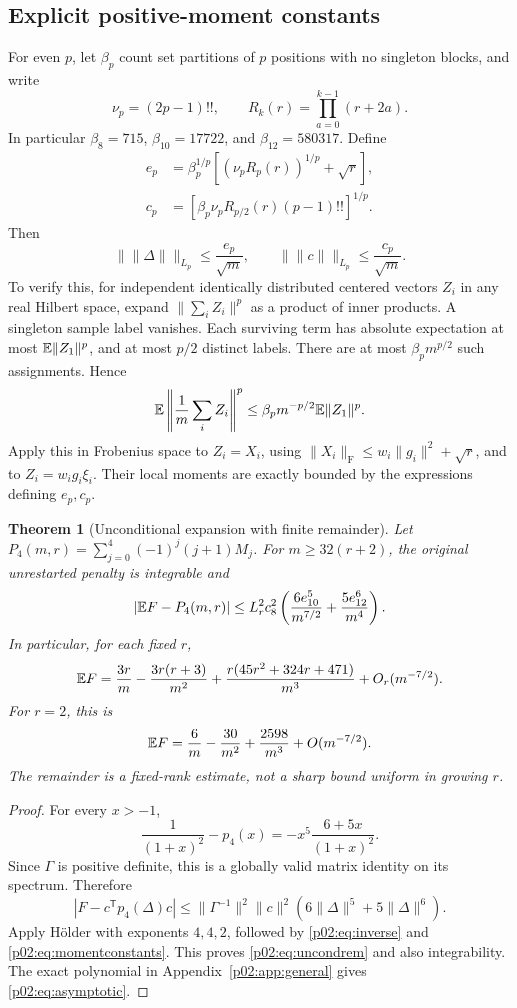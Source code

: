 \documentclass[11pt]{article}
\numberwithin{equation}{section}
\newtheorem{theorem}{Theorem}[section]
\theoremstyle{definition}\newtheorem{definition}[theorem]{Definition}
\theoremstyle{remark}\newtheorem{remark}[theorem]{Remark}
\newcommand{\norm}[1]{\lVert#1\rVert}\newcommand{\ip}[2]{\langle#1,#2\rangle}
\newcommand{\Frob}[1]{\norm{#1}_{\mathrm F}}
\begin{document}
\subsection{Explicit positive-moment constants}
For even \(p\), let \(\beta_p\) count set partitions of \(p\) positions with no singleton blocks, and write
\[
 \nu_p=(2p-1)!!,\qquad R_k(r)=\prod_{a=0}^{k-1}(r+2a).
\]
In particular \(\beta_8=715\), \(\beta_{10}=17722\), and \(\beta_{12}=580317\).
Define
\begin{align*}
 e_p&=\beta_p^{1/p}\left[(\nu_pR_p(r))^{1/p}+\sqrt r\right],\\
 c_p&=\left[\beta_p\nu_pR_{p/2}(r)(p-1)!!\right]^{1/p}.
\end{align*}
Then
\begin{equation}\label{p02:eq:momentconstants}
 \bigl\|\norm \Delta\bigr\|_{L_p}\le\frac{e_p}{\sqrt m},\qquad
 \bigl\|\norm c\bigr\|_{L_p}\le\frac{c_p}{\sqrt m}.
\end{equation}
To verify this, for independent identically distributed centered vectors \(Z_i\) in any real Hilbert space, expand \(\norm{\sum_i Z_i}^{p}\) as a product of inner products. A singleton sample label vanishes. Each surviving term has absolute expectation at most \(\E\norm{Z_1}^p\), and at most \(p/2\) distinct labels. There are at most \(\beta_pm^{p/2}\) such assignments. Hence
\[
 \E\left\|\frac1m\sum_i Z_i\right\|^p
 \le\beta_pm^{-p/2}\E\norm{Z_1}^p.
\]
Apply this in Frobenius space to \(Z_i=X_i\), using
\(\Frob{X_i}\le w_i\norm{g_i}^2+\sqrt r\), and to \(Z_i=w_ig_i\xi_i\). Their local moments are exactly bounded by the expressions defining \(e_p,c_p\).

\begin{theorem}[Unconditional expansion with finite remainder]\label{p02:thm:unconditional}
Let
\(P_4(m,r)=\sum_{j=0}^4(-1)^j(j+1)M_j\).
For \(m\ge32(r+2)\), the original unrestarted penalty is integrable and
\begin{equation}\label{p02:eq:uncondrem}
 \left|\mathbb E F-P_4(m,r)\right|
 \le L_r^2c_8^2\left(\frac{6e_{10}^5}{m^{7/2}}+\frac{5e_{12}^6}{m^4}\right).
\end{equation}
In particular, for each fixed \(r\),
\begin{equation}\label{p02:eq:asymptotic}
 \mathbb E F=\frac{3r}{m}-\frac{3r(r+3)}{m^2}
 +\frac{r(45r^2+324r+471)}{m^3}+O_r(m^{-7/2}).
\end{equation}
For \(r=2\), this is
\[
 \mathbb E F=\frac6m-\frac{30}{m^2}+\frac{2598}{m^3}+O(m^{-7/2}).
\]
The remainder is a fixed-rank estimate, not a sharp bound uniform in growing \(r\).
\end{theorem}
\begin{proof}
For every \(x>-1\),
\[
 \frac1{(1+x)^2}-p_4(x)
 =-x^5\frac{6+5x}{(1+x)^2}.
\]
Since \(\Gamma\) is positive definite, this is a globally valid matrix identity on its spectrum. Therefore
\[
 |F-c^{\mathsf T}p_4(\Delta)c|
 \le\norm{\Gamma^{-1}}^2\norm c^2(6\norm \Delta^5+5\norm \Delta^6).
\]
Apply H\"older with exponents \(4,4,2\), followed by \eqref{p02:eq:inverse} and \eqref{p02:eq:momentconstants}. This proves \eqref{p02:eq:uncondrem} and also integrability. The exact polynomial in Appendix~\ref{p02:app:general} gives \eqref{p02:eq:asymptotic}.
\end{proof}
\end{document}
